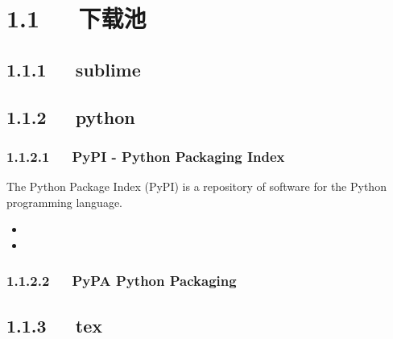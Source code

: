 \documentclass[letterpaper,12pt,english]{sphinxmanual}
\begin{document}
\section{1.1   下载池}
\label{\detokenize{001software/001install/001._u7f51_u7ad9/_u7f51_u7ad9_u8d44_u6e90_u7ad9_u70b9:id3}}

\subsection{1.1.1   sublime}
\label{\detokenize{001software/001install/001._u7f51_u7ad9/_u7f51_u7ad9_u8d44_u6e90_u7ad9_u70b9:sublime}}


\subsection{1.1.2   python}
\label{\detokenize{001software/001install/001._u7f51_u7ad9/_u7f51_u7ad9_u8d44_u6e90_u7ad9_u70b9:python}}

\subsubsection{1.1.2.1   PyPI - Python Packaging Index}
\label{\detokenize{001software/001install/001._u7f51_u7ad9/_u7f51_u7ad9_u8d44_u6e90_u7ad9_u70b9:pypi-python-packaging-index}}
The Python Package Index (PyPI) is a repository of software for the
Python programming language.
\begin{itemize}
\item {} 

\item {} 

\end{itemize}


\subsubsection{1.1.2.2   PyPA Python Packaging}
\label{\detokenize{001software/001install/001._u7f51_u7ad9/_u7f51_u7ad9_u8d44_u6e90_u7ad9_u70b9:pypa-python-packaging}}

\subsection{1.1.3   tex}
\label{\detokenize{001software/001install/001._u7f51_u7ad9/_u7f51_u7ad9_u8d44_u6e90_u7ad9_u70b9:tex}}
\end{document}
